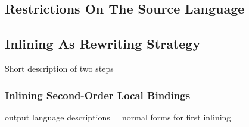 \documentclass[a4paper,11pt,oneside]{article}
\theoremstyle{plain}
\begin{document}
\subsection{Restrictions On The Source Language}
	

\subsection{Inlining As Rewriting Strategy}

Short description of two steps
\subsubsection*{Inlining Second-Order Local Bindings}


output language descriptions = normal forms for first inlining
\end{document}
